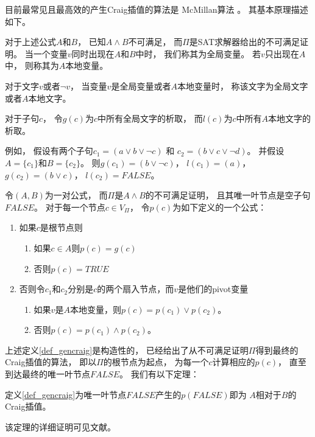 目前最常见且最高效的产生Craig插值的算法是
McMillan算法 。
其基本原理描述如下。

对于上述公式$A$和$B$，
已知$A\wedge B$不可满足，
而$\Pi$是SAT求解器给出的不可满足证明。
当一个变量$v$同时出现在$A$和$B$中时，
我们称其为全局变量。
若$v$只出现在$A$中，
则称其为$A$本地变量。

对于文字$v$或者$\neg v$，
当变量$v$是全局变量或者$A$本地变量时，
称该文字为全局文字或者$A$本地文字。

对于子句$c$，
令$g(c)$为$c$中所有全局文字的析取，
而$l(c)$为$c$中所有$A$本地文字的析取。

例如，
假设有两个子句$c_1=(a\vee b\vee\neg c)$ 和
$c_2=(b\vee c\vee\neg d)$。
并假设$A=\{c_1\}$和$B=\{c_2\}$。
则$g(c_1)=(b\vee\neg c)$，
$l(c_1)=(a)$，
$g(c_2)=(b\vee c)$，
$l(c_2)=FALSE$。


\begin{definition}\label{def_gencraig}
令$(A,B)$为一对公式，
而$\Pi$是$A\wedge B$的不可满足证明，
且其唯一叶节点是空子句$FALSE$。
对于每一个节点$c\in V_{\Pi}$，
令$p(c)$为如下定义的一个公式：
\begin{enumerate}
\item 如果$c$是根节点则
  \begin{enumerate}
    \item 如果$c\in A$则$p(c)=g(c)$
    \item 否则$p(c)=TRUE$
  \end{enumerate}
\item 否则令$c_1$和$c_2$分别是$c$的两个扇入节点，而$v$是他们的pivot变量
  \begin{enumerate}
    \item 如果$v$是$A$本地变量，则$p(c)=p(c_1)\vee p(c_2)$。
    \item 否则$p(c)=p(c_1)\wedge p(c_2)$。
  \end{enumerate}
\end{enumerate}
\end{definition}

上述定义\ref{def_gencraig}是构造性的，
已经给出了从不可满足证明$\Pi$得到最终的Craig插值的算法，
即以$\Pi$的根节点为起点，
为每一个$c$计算相应的$p(c)$，
直至到达最终的唯一叶节点$FALSE$。
我们有以下定理：

\begin{theorem}
定义\ref{def_gencraig}为唯一叶节点$FALSE$产生的$p(FALSE)$即为
$A$相对于$B$的Craig插值。
\end{theorem}

该定理的详细证明可见文献。

